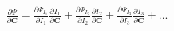 \documentclass[preview]{standalone}
\begin{document}
\begin{align*}
\frac{\partial \Psi}{\partial \mathbf{C}}  =  \frac{\partial \Psi_{I_1}}{\partial I_1} \frac{\partial I_1}{\partial \mathbf{C}}  +  \frac{\partial \Psi_{I_2}}{\partial I_2} \frac{\partial I_2}{\partial \mathbf{C}}  +  \frac{\partial \Psi_{I_3}}{\partial I_3} \frac{\partial I_3}{\partial \mathbf{C}}  + ...
\end{align*}
\end{document}
